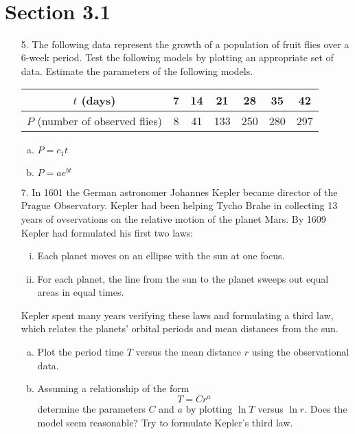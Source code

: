 \documentclass[10pt]{report}
\title{
	\courseTitle\\
	\hwNo\\
	\hwDate
}
\author{\hwAuther}
\date{}
\begin{document}
\maketitle

\section*{Section 3.1}
\begin{enumerate}
	\item [5.]
	The following data represent the growth of a population of fruit flies over a 6-week period. Test the following models by plotting an appropriate set of data. Estimate the parameters of the following models.
	\begin{table}[H]
		\centering
		\begin{tabular}{*{7}{c}} 
			\toprule
			$t$ (days) & 7 & 14 & 21 & 28 & 35 & 42 \\ \midrule
			$P$ (number of observed flies) & 8 & 41 & 133 & 250 & 280 & 297 \\
			\bottomrule
		\end{tabular}
	\end{table}
	\begin{enumerate}[a.]
		\item 
		$P = c_1 t$
		
		\item 
		$P = a e^{bt}$
	\end{enumerate}

	\item [7.]
	In 1601 the German astronomer Johannes Kepler became director of the Prague Observatory. Kepler had been helping Tycho Brahe in collecting 13 years of ovservations on the relative motion of the planet Mars. By 1609 Kepler had formulated his first two laws:
	\begin{enumerate}[i.]
		\item 
		Each planet moves on an ellipse with the sun at one focus.
		
		\item 
		For each planet, the line from the sun to the planet sweeps out equal areas in equal times.
	\end{enumerate}
	Kepler spent many years verifying these laws and formulating a third law, which relates the planets' orbital periods and mean distances from the sun.
	\begin{enumerate}[a.]
		\item 
		Plot the period time $T$ versus the mean distance $r$ using the observational data.
		
		\item 
		Assuming a relationship of the form
		\[
		T = C r^a
		\]
		determine the parameters $C$ and $a$ by plotting $\ln{T}$ versus $\ln{r}$. Does the model seem reasonable? Try to formulate Kepler's third law.
	\end{enumerate}
\end{enumerate}
\end{document}
